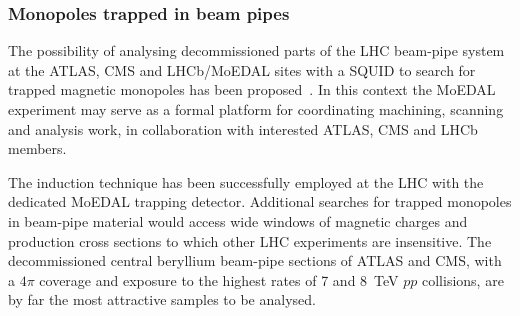 \subsubsection{Monopoles trapped in beam pipes}\label{sc:pipes}

The possibility of analysing decommissioned parts of the LHC beam-pipe system at the ATLAS, CMS and LHCb/MoEDAL sites with a SQUID to search for trapped magnetic monopoles has been proposed~\cite{beampipe-proposal}. In this context the MoEDAL experiment may serve as a formal platform for coordinating machining, scanning and analysis work, in collaboration with interested ATLAS, CMS and LHCb members. 

The induction technique has been successfully employed at the LHC with the dedicated MoEDAL trapping detector. Additional searches for trapped monopoles in beam-pipe material would access wide windows of magnetic charges and production cross sections to which other LHC experiments are insensitive. The decommissioned central beryllium beam-pipe sections of ATLAS and CMS, with a $4\pi$ coverage and exposure to the highest rates of 7 and 8~TeV $pp$ collisions, are by far the most attractive samples to be analysed.

